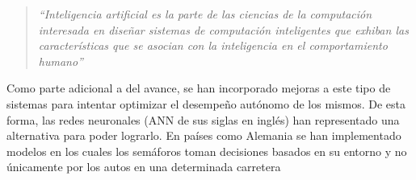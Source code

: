 		\begin{quote}
			\textit{``Inteligencia artificial es la parte de las ciencias de
			la computaci\'{o}n interesada en dise\~{n}ar sistemas de computaci\'{o}n inteligentes que exhiban las
			caracter\'{i}sticas que se asocian con la inteligencia en el comportamiento
			humano''} \cite{Rajendra2005} %
		\end{quote}

		Como parte adicional a del avance, se han incorporado mejoras a este tipo de
	sistemas para intentar optimizar el desempe\~{n}o aut\'{o}nomo de los mismos. De esta
	forma, las redes neuronales (ANN de sus siglas en ingl\'{e}s) han representado una
	alternativa para poder lograrlo. En pa\'{i}ses como Alemania se han implementado
	modelos en los cuales los sem\'{a}foros toman decisiones basados en su entorno
	y no \'{u}nicamente por los autos en una determinada carretera \cite{Ben2010}
